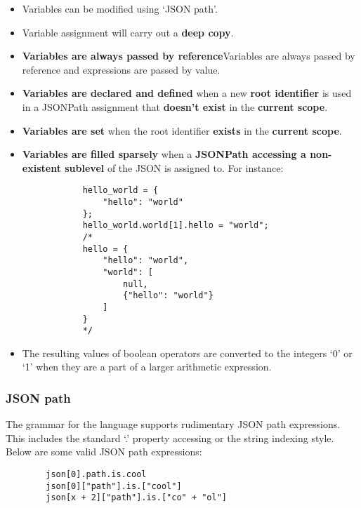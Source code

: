 \documentclass[12pt, letterpaper]{article}
\begin{document}
\begin{center}
    \begin{itemize} 
        \item Variables can be modified using `JSON path'.
        \item Variable assignment will carry out a \textbf{deep copy}.
        \item \textbf{Variables are always passed by reference}{Variables are always passed by reference} and expressions are passed by value.
        \item \textbf{Variables are declared and defined} when a new \textbf{root identifier} is used in a JSONPath assignment that \textbf{doesn't exist} in the \textbf{current scope}.
        \item \textbf{Variables are set} when the root identifier \textbf{exists} in the \textbf{current scope}.
        \item \textbf{Variables are filled sparsely} when a \textbf{JSONPath accessing a non-existent sublevel} of the JSON is assigned to. For instance:
        \begin{verbatim}
            hello_world = {
                "hello": "world"
            };
            hello_world.world[1].hello = "world";
            /*
            hello = {
                "hello": "world",
                "world": [
                    null,
                    {"hello": "world"}
                ]
            }
            */
        \end{verbatim}
        \item The resulting values of boolean operators are converted to the integers `0' or `1' when they are a part of a larger arithmetic expression.
    \end{itemize}
\end{center}

\subsubsection{JSON path}

The grammar for the language supports rudimentary JSON path expressions. This includes the standard `.' property accessing or the string indexing style. Below are some valid JSON path expressions:

\begin{center}
    \begin{verbatim}
        json[0].path.is.cool
        json[0]["path"].is.["cool"]
        json[x + 2]["path"].is.["co" + "ol"]
    \end{verbatim}
\end{center}
\end{document}
